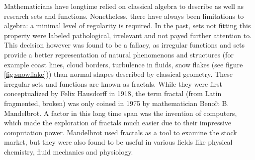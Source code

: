 \documentclass[10pt,a4paper,titlepage]{article}
\begin{document}
	
	
	
	Mathematicians have longtime relied on classical algebra to describe as well as research sets and functions. Nonetheless, there have always been limitations to algebra: a minimal level of regularity is required. In the past, sets not fitting this property were labeled pathological, irrelevant and not payed further attention to. This decision however was found to be a fallacy, as irregular functions and sets provide a better representation of natural phenomenons and structures (for example coast lines, cloud borders, turbulence in fluids, snow flakes (see figure \ref{fig:snowflake})) than normal shapes described by classical geometry. These irregular sets and functions are known as fractals. While they were first conceptualized by Felix Hausdorff in 1918, the term fractal (from Latin fragmented, broken) was only coined in 1975 by mathematician Benoît B. Mandelbrot. A factor in this long time span was the invention of computers, which made the exploration of fractals much easier due to their impressive computation power. Mandelbrot used fractals as a tool to examine the stock market, but they were also found to be useful in various fields like physical chemistry, fluid mechanics and physiology\cite{FalconerKennethJ1993FG:m, britannica}.\\
\end{document}
